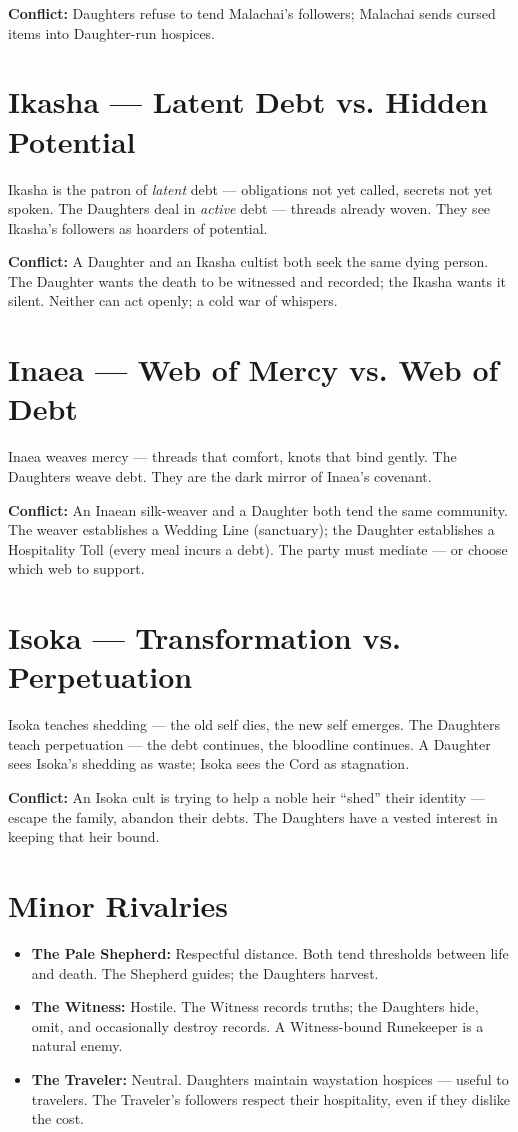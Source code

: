 \documentclass[10pt,twoside]{book}
\begin{document}
\textbf{Conflict:} Daughters refuse to tend Malachai's followers; Malachai sends cursed items into Daughter-run hospices.

\section{Ikasha --- Latent Debt vs. Hidden Potential}
Ikasha is the patron of \emph{latent} debt --- obligations not yet called, secrets not yet spoken. The Daughters deal in \emph{active} debt --- threads already woven. They see Ikasha's followers as hoarders of potential.

\textbf{Conflict:} A Daughter and an Ikasha cultist both seek the same dying person. The Daughter wants the death to be witnessed and recorded; the Ikasha wants it silent. Neither can act openly; a cold war of whispers.

\section{Inaea --- Web of Mercy vs. Web of Debt}
Inaea weaves mercy --- threads that comfort, knots that bind gently. The Daughters weave debt. They are the dark mirror of Inaea's covenant.

\textbf{Conflict:} An Inaean silk-weaver and a Daughter both tend the same community. The weaver establishes a Wedding Line (sanctuary); the Daughter establishes a Hospitality Toll (every meal incurs a debt). The party must mediate --- or choose which web to support.

\section{Isoka --- Transformation vs. Perpetuation}
Isoka teaches shedding --- the old self dies, the new self emerges. The Daughters teach perpetuation --- the debt continues, the bloodline continues. A Daughter sees Isoka's shedding as waste; Isoka sees the Cord as stagnation.

\textbf{Conflict:} An Isoka cult is trying to help a noble heir ``shed'' their identity --- escape the family, abandon their debts. The Daughters have a vested interest in keeping that heir bound.

\section{Minor Rivalries}
\begin{itemize}
\item \textbf{The Pale Shepherd:} Respectful distance. Both tend thresholds between life and death. The Shepherd guides; the Daughters harvest.
\item \textbf{The Witness:} Hostile. The Witness records truths; the Daughters hide, omit, and occasionally destroy records. A Witness-bound Runekeeper is a natural enemy.
\item \textbf{The Traveler:} Neutral. Daughters maintain waystation hospices --- useful to travelers. The Traveler's followers respect their hospitality, even if they dislike the cost.
\end{itemize}
\end{document}
